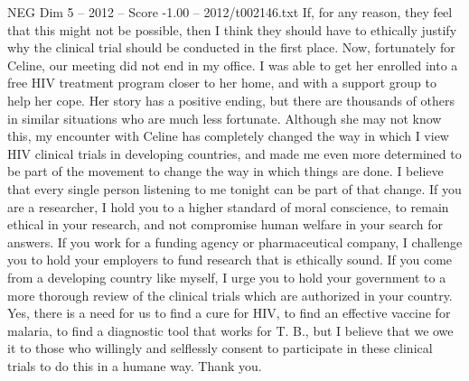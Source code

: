 \begin{textsample}{NEG Dim 5 – 2012 – Score -1.00 – 2012/t002146.txt}
If, for any reason, they feel that this might not be possible, then I think they should have to ethically justify why the clinical trial should be conducted in the first place.
Now, fortunately for Celine, our meeting did not end in my office.
I was able to get her enrolled into a free HIV treatment program closer to her home, and with a support group to help her cope.
Her story has a positive ending, but there are thousands of others in similar situations who are much less fortunate.
Although she may not know this, my encounter with Celine has completely changed the way in which I view HIV clinical trials in developing countries, and made me even more determined to be part of the movement to change the way in which things are done.
I believe that every single person listening to me tonight can be part of that change.
If you are a researcher, I hold you to a higher standard of moral conscience, to remain ethical in your research, and not compromise human welfare in your search for answers.
If you work for a funding agency or pharmaceutical company, I challenge you to hold your employers to fund research that is ethically sound.
If you come from a developing country like myself, I urge you to hold your government to a more thorough review of the clinical trials which are authorized in your country.
Yes, there is a need for us to find a cure for HIV, to find an effective vaccine for malaria, to find a diagnostic tool that works for T.
B., but I believe that we owe it to those who willingly and selflessly consent to participate in these clinical trials to do this in a humane way.
Thank you.

\end{textsample}
